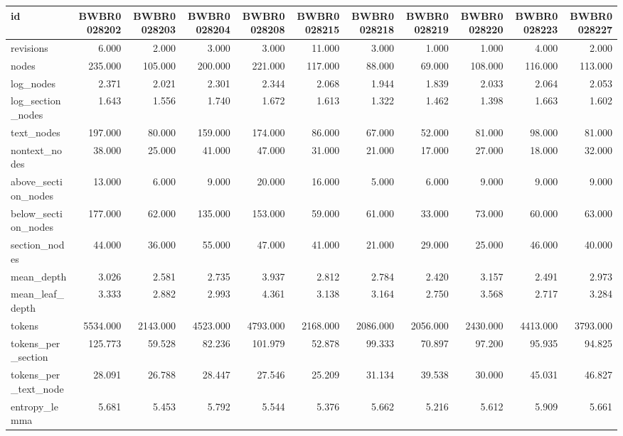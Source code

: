 \begin{tabular}{lrrrrrrrrrr}
\toprule
id & BWBR0028202 & BWBR0028203 & BWBR0028204 & BWBR0028208 & BWBR0028215 & BWBR0028218 & BWBR0028219 & BWBR0028220 & BWBR0028223 & BWBR0028227 \\
\midrule
revisions & 6.000 & 2.000 & 3.000 & 3.000 & 11.000 & 3.000 & 1.000 & 1.000 & 4.000 & 2.000 \\
\cline{1-11}
nodes & 235.000 & 105.000 & 200.000 & 221.000 & 117.000 & 88.000 & 69.000 & 108.000 & 116.000 & 113.000 \\
\cline{1-11}
log\_nodes & 2.371 & 2.021 & 2.301 & 2.344 & 2.068 & 1.944 & 1.839 & 2.033 & 2.064 & 2.053 \\
\cline{1-11}
log\_section\_nodes & 1.643 & 1.556 & 1.740 & 1.672 & 1.613 & 1.322 & 1.462 & 1.398 & 1.663 & 1.602 \\
\cline{1-11}
text\_nodes & 197.000 & 80.000 & 159.000 & 174.000 & 86.000 & 67.000 & 52.000 & 81.000 & 98.000 & 81.000 \\
\cline{1-11}
nontext\_nodes & 38.000 & 25.000 & 41.000 & 47.000 & 31.000 & 21.000 & 17.000 & 27.000 & 18.000 & 32.000 \\
\cline{1-11}
above\_section\_nodes & 13.000 & 6.000 & 9.000 & 20.000 & 16.000 & 5.000 & 6.000 & 9.000 & 9.000 & 9.000 \\
\cline{1-11}
below\_section\_nodes & 177.000 & 62.000 & 135.000 & 153.000 & 59.000 & 61.000 & 33.000 & 73.000 & 60.000 & 63.000 \\
\cline{1-11}
section\_nodes & 44.000 & 36.000 & 55.000 & 47.000 & 41.000 & 21.000 & 29.000 & 25.000 & 46.000 & 40.000 \\
\cline{1-11}
mean\_depth & 3.026 & 2.581 & 2.735 & 3.937 & 2.812 & 2.784 & 2.420 & 3.157 & 2.491 & 2.973 \\
\cline{1-11}
mean\_leaf\_depth & 3.333 & 2.882 & 2.993 & 4.361 & 3.138 & 3.164 & 2.750 & 3.568 & 2.717 & 3.284 \\
\cline{1-11}
tokens & 5534.000 & 2143.000 & 4523.000 & 4793.000 & 2168.000 & 2086.000 & 2056.000 & 2430.000 & 4413.000 & 3793.000 \\
\cline{1-11}
tokens\_per\_section & 125.773 & 59.528 & 82.236 & 101.979 & 52.878 & 99.333 & 70.897 & 97.200 & 95.935 & 94.825 \\
\cline{1-11}
tokens\_per\_text\_node & 28.091 & 26.788 & 28.447 & 27.546 & 25.209 & 31.134 & 39.538 & 30.000 & 45.031 & 46.827 \\
\cline{1-11}
entropy\_lemma & 5.681 & 5.453 & 5.792 & 5.544 & 5.376 & 5.662 & 5.216 & 5.612 & 5.909 & 5.661 \\

\end{tabular}
